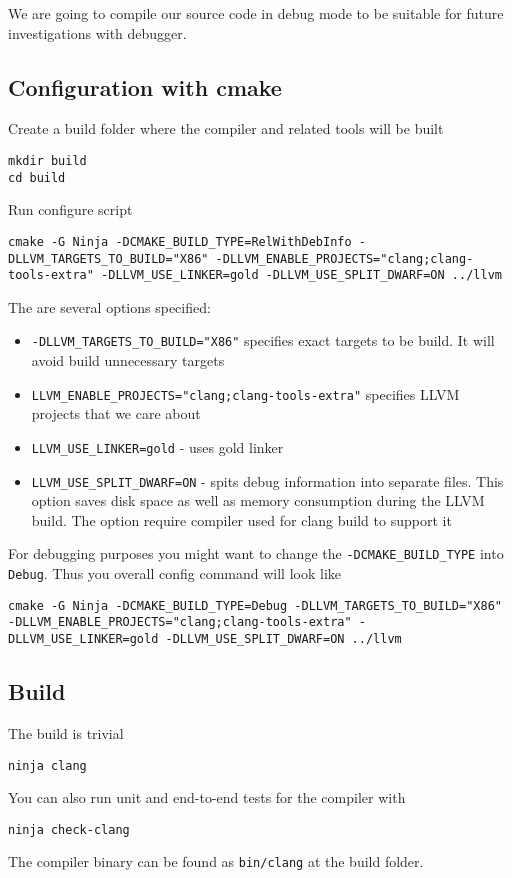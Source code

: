 We are going to compile our source code in debug mode to be suitable
for future investigations with debugger.

\subsection{Configuration with cmake}
Create a build folder where the compiler and related tools will be
built
\begin{verbatim}
mkdir build
cd build
\end{verbatim}
Run configure script
\begin{verbatim}
cmake -G Ninja -DCMAKE_BUILD_TYPE=RelWithDebInfo -DLLVM_TARGETS_TO_BUILD="X86" -DLLVM_ENABLE_PROJECTS="clang;clang-tools-extra" -DLLVM_USE_LINKER=gold -DLLVM_USE_SPLIT_DWARF=ON ../llvm
\end{verbatim}
The are several options specified:
\begin{itemize}
  \item \texttt{-DLLVM_TARGETS_TO_BUILD="X86"} specifies exact
    targets to be build. It will avoid build unnecessary targets
  \item \texttt{LLVM_ENABLE_PROJECTS="clang;clang-tools-extra"}
    specifies LLVM projects that we care about
\item \texttt{LLVM_USE_LINKER=gold} - uses gold linker
\item \texttt{LLVM_USE_SPLIT_DWARF=ON} - spits debug information into
  separate files. This option saves disk space as well as memory
  consumption during the LLVM build. The option require compiler used
  for clang build to support it
\end{itemize}
For debugging purposes you might want to change the
\texttt{-DCMAKE_BUILD_TYPE} into
\texttt{Debug}. Thus you overall config command will look
like
\begin{verbatim}
cmake -G Ninja -DCMAKE_BUILD_TYPE=Debug -DLLVM_TARGETS_TO_BUILD="X86" -DLLVM_ENABLE_PROJECTS="clang;clang-tools-extra" -DLLVM_USE_LINKER=gold -DLLVM_USE_SPLIT_DWARF=ON ../llvm
\end{verbatim}


\subsection{Build}
The build is trivial
\begin{verbatim}
ninja clang
\end{verbatim}
You can also run unit and end-to-end tests for the compiler with
\begin{verbatim}
ninja check-clang
\end{verbatim}
The compiler binary can be found as \texttt{bin/clang} at the build folder. 
